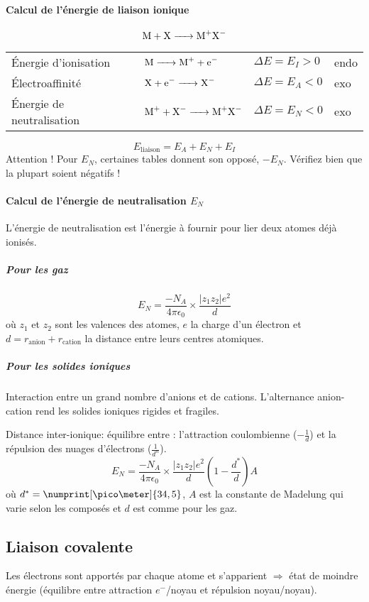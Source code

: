 \paragraph{Calcul de l'énergie de liaison ionique}
\[ \ce{M + X -> M+X-} \]
\begin{center}
  \begin{tabular}{llll}
    \'Energie d'ionisation & $\ce{M -> M+ + e-}$ & $\Delta E = E_I > 0$ & endo\\
    \'Electroaffinité & $\ce{X + e- -> X-}$ & $\Delta E = E_A < 0$ & exo\\
    \'Energie de neutralisation & $\ce{M+ + X- -> M+X-}$ & $\Delta E = E_N < 0$ & exo
  \end{tabular}
\end{center}
\[ E_{\mathrm{liaison}} = E_A + E_N + E_I \]
Attention !
Pour $E_N$,
certaines tables donnent son opposé, $-E_N$.
Vérifiez bien que la plupart soient négatifs !

\paragraph{Calcul de l'énergie de neutralisation $E_N$}
\label{sec:neutral}
L'énergie de neutralisation est l'énergie à fournir pour lier deux atomes déjà ionisés.

\subparagraph{Pour les gaz}
\[ E_N = \frac{-N_A}{4\pi\epsilon_0}\times\frac{|z_1z_2|e^2}{d} \]
où $z_1$ et $z_2$ sont les valences des atomes,
$e$ la charge d'un électron et $d = r_{\mathrm{anion}} + r_{\mathrm{cation}}$ la distance entre leurs centres atomiques.
\subparagraph{Pour les solides ioniques}
Interaction entre un grand nombre d'anions et de cations.
L'alternance anion-cation rend les solides ioniques rigides et fragiles.

Distance inter-ionique: équilibre entre : l'attraction coulombienne ($-\frac{1}{d}$) et la répulsion des nuages d'électrons ($\frac{1}{d^n}$).
\[ E_N = \frac{-N_A}{4\pi\epsilon_0}\times\frac{|z_1z_2|e^2}{d} \left(1-\frac{d^*}{d}\right)A \]
où $d^* = \numprint[\pico\meter]{34,5}$,
$A$ est la constante de Madelung qui varie selon les composés et $d$ est comme pour les gaz.

\subsection{Liaison covalente}

Les électrons sont apportés par chaque atome et s'apparient $\Rightarrow$ état de moindre énergie (équilibre entre attraction $e^-$/noyau et répulsion noyau/noyau).

